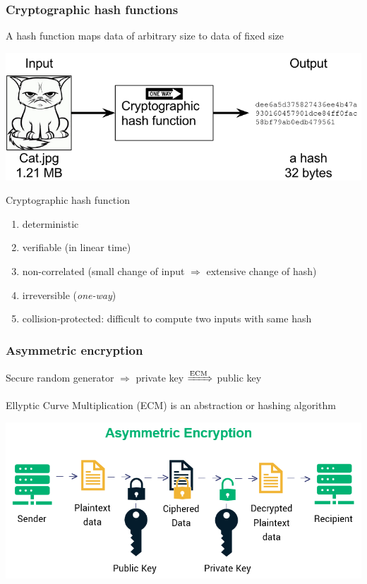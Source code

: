 \documentclass[11pt]{beamer}  %
\begin{document}
\begin{frame}\frametitle{Cryptographic hash functions}

  \begin{greenbox}{}
    A \alert{hash function} maps data of arbitrary size to data of fixed size
  \end{greenbox}

  \begin{center}
    \includegraphics[scale=0.38,clip=false]{pictures/hashing.png}
  \end{center}

  \begin{greenbox}{Cryptographic hash function}
    \begin{enumerate}
    \item deterministic
    \item verifiable (in linear time)
    \item non-correlated (small change of input $\Rightarrow$ extensive change of hash)
    \item irreversible (\emph{one-way})
    \item collision-protected: difficult to compute two inputs with same hash
    \end{enumerate}
  \end{greenbox}
  
\end{frame}

\begin{frame}\frametitle{Asymmetric encryption}

  \begin{center}
    Secure random generator $\Rightarrow$ private key $\xRightarrow[]{\text{ECM}}$ public key
  \end{center}

  Ellyptic Curve Multiplication (ECM) is an abstraction or hashing algorithm
  
  \begin{center}
    \includegraphics[scale=0.5,clip=false]{pictures/asymmetric-encryption.png}
  \end{center}

\end{frame}
\end{document}
